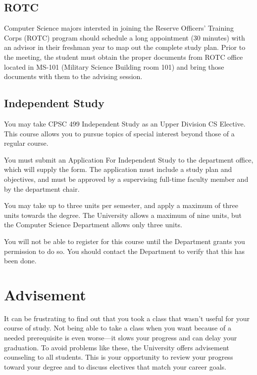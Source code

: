 \documentclass{book}
\begin{document}
\section{ROTC}

Computer Science majors intersted in joining the Reserve Officers' Training
Corps (ROTC) program should schedule a long appointment (30 minutes) with an
advisor in their freshman year to map out the complete study plan.  Prior to
the meeting, the student must obtain the proper documents from ROTC office
located in MS-101 (Military Science Building room 101) and bring those
documents with them to the advising session.

\section{Independent Study}

You may take CPSC 499 Independent Study as an Upper Division CS Elective. This course allows you to pursue topics of special interest beyond those of a regular course.

You must submit an Application For Independent Study to the department office, which will supply the form. The application must include a study plan and objectives, and must be approved by a supervising full-time faculty member and by the department chair.

You may take up to three units per semester, and apply a maximum of three units towards the degree. The University allows a maximum of nine units, but the Computer Science Department allows only three units.

You will not be able to register for this course until the Department grants you permission to do so. You should contact the Department to verify that this has been done.

\chapter{Advisement}

It can be frustrating to find out that you took a class that wasn't useful for your course of study. Not being able to take a class when you want because of a needed prerequisite is even worse---it slows your progress and can delay your graduation. To avoid problems like these, the University offers advisement counseling to all students. This is your opportunity to review your progress toward your degree and to discuss electives that match your career goals.
\end{document}
